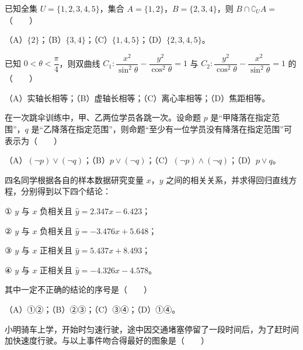 

\begin{question}
已知全集 $U=\{1,2,3,4,5\}$，集合 $A=\{1,2\}$，$B=\{2,3,4\}$，则 $B\cap\complement_U A=$\mbox{（　　）}

（A）$\{2\}$；（B）$\{3,4\}$；（C）$\{1,4,5\}$；（D）$\{2,3,4,5\}$。

\end{question}
\begin{question}
已知 $0<\theta<\dfrac\pi4$，则双曲线 $C_1:\dfrac{x^2}{\sin^2\theta}-\dfrac{y^2}{\cos^2\theta}=1$ 与 $C_2:\dfrac{y^2}{\cos^2\theta}-\dfrac{x^2}{\sin^2\theta}=1$ 的\mbox{（　　）}

（A）实轴长相等；（B）虚轴长相等；（C）离心率相等；（D）焦距相等。

\end{question}
\begin{question}
在一次跳伞训练中，甲、乙两位学员各跳一次。设命题 $p$ 是“甲降落在指定范围”，$q$ 是“乙降落在指定范围”，则命题“至少有一位学员没有降落在指定范围”可表示为\mbox{（　　）}

（A）$(\neg p)\lor(\neg q)$；（B）$p\lor(\neg q)$；（C）$(\neg p)\land(\neg q)$；（D）$p\lor q$。

\end{question}
\begin{question}
四名同学根据各自的样本数据研究变量 $x$，$y$ 之间的相关关系，并求得回归直线方程，分别得到以下四个结论：

① $y$ 与 $x$ 负相关且 $\hat y=2.347x-6.423$；

② $y$ 与 $x$ 负相关且 $\hat y=-3.476x+5.648$；

③ $y$ 与 $x$ 正相关且 $\hat y=5.437x+8.493$；

④ $y$ 与 $x$ 正相关且 $\hat y=-4.326x-4.578$。

其中一定不正确的结论的序号是\mbox{（　　）}

（A）①②；（B）②③；（C）③④；（D）①④。

\Needspace{0.4\textheight}
\end{question}
\begin{question}
小明骑车上学，开始时匀速行驶，途中因交通堵塞停留了一段时间后，为了赶时间加快速度行驶。与以上事件吻合得最好的图象是\mbox{（　　）}
\nopagebreak[4]
\begin{center}\end{center}
\nopagebreak[4]
\end{question}
